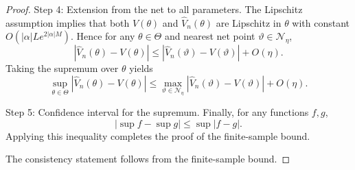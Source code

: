\documentclass[10pt,a4paper]{amsart}
\providecommand{\paragraph}{}
\begin{document}
\begin{proof}
\paragraph{Step 4: Extension from the net to all parameters.}
The Lipschitz assumption implies that both $V(\theta)$ and $\widehat V_n(\theta)$
are Lipschitz in $\theta$ with constant
$O(|\alpha|Le^{2|\alpha|M})$.
Hence for any $\theta\in\Theta$ and nearest net point $\vartheta\in\mathcal{N}_\eta$,
\[
|\widehat V_n(\theta)-V(\theta)|
\le
|\widehat V_n(\vartheta)-V(\vartheta)| + O(\eta).
\]
Taking the supremum over $\theta$ yields
\[
\sup_{\theta\in\Theta}|\widehat V_n(\theta)-V(\theta)|
\le
\max_{\vartheta\in\mathcal{N}_\eta}|\widehat V_n(\vartheta)-V(\vartheta)| + O(\eta).
\]

\paragraph{Step 5: Confidence interval for the supremum.}
Finally, for any functions $f,g$,
\[
|\sup f - \sup g| \le \sup |f-g|.
\]
Applying this inequality completes the proof of the finite-sample bound.

The consistency statement follows from the finite-sample bound.

\end{proof}
\end{document}
